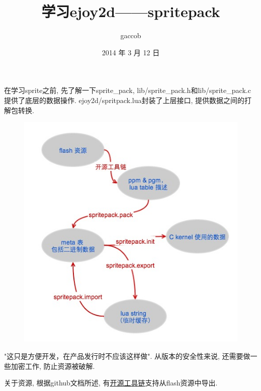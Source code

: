 

\title {\ZHH \huge 学习ejoy2d——spritepack}
\author {\small gaccob}
\date {\small 2014 年 3 月 12 日}
\maketitle

{在学习sprite之前, 先了解一下sprite\_pack, lib/sprite\_pack.h和lib/sprite\_pack.c提供了底层的数据操作. ejoy2d/spritpack.lua封装了上层接口, 提供数据之间的打解包转换.}\par

\begin {figure}[htbp]
    \centering
    \includegraphics [width=350pt, keepaspectratio] {sprite_pack.jpg}
\end {figure}

{"这只是方便开发，在产品发行时不应该这样做". 从版本的安全性来说, 还需要做一些加密工作, 防止资源被破解. }\par

{关于资源, 根据github文档所述, 有\href{https://github.com/robinxb/flash-parser}{开源工具链}支持从flash资源中导出. }\par


